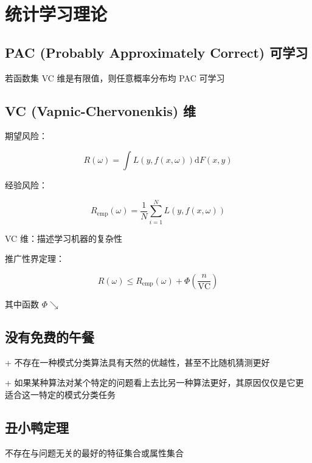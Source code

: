 \documentclass[openany,a4paper,12pt]{ctexbook}
\theoremstyle{kaiti}
\theoremstyle{normal}
\begin{document}
\chapter{统计学习理论}

\section{PAC (Probably Approximately Correct) 可学习}

若函数集 VC 维是有限值，则任意概率分布均 PAC 可学习

\section{VC (Vapnic-Chervonenkis) 维}

期望风险：

\begin{equation}
R\left(\omega \right)=\int L\left(y,f\left(x,\omega \right)\right)\mathrm{d}F\left(x,y \right)
\end{equation}

经验风险：

\begin{equation}
R_{\mathrm{emp}}\left(\omega \right)=\frac{1}{N}\sum_{i=1}^{N}L\left(y,f\left(x,\omega \right)\right)
\end{equation}

VC 维：描述学习机器的复杂性

推广性界定理：

\begin{equation}
R\left(\omega \right)\leqslant R_{\mathrm{emp}}\left(\omega \right)+\Phi \left(\frac{n}{\mathrm{VC}}\right)
\end{equation}

其中函数 $\Phi \searrow$

\section{没有免费的午餐}

+ 不存在一种模式分类算法具有天然的优越性，甚至不比随机猜测更好

+ 如果某种算法对某个特定的问题看上去比另一种算法更好，其原因仅仅是它更适合这一特定的模式分类任务

\section{丑小鸭定理}

不存在与问题无关的最好的特征集合或属性集合
\end{document}
